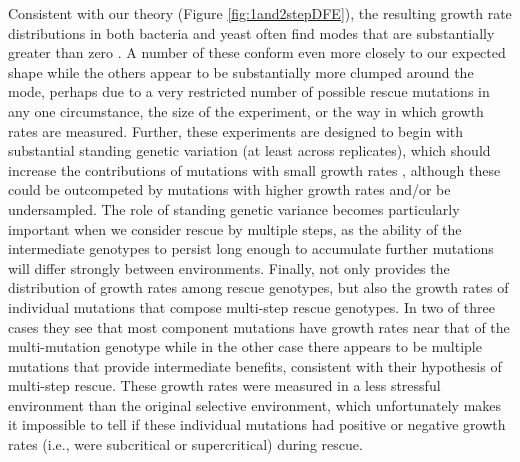 \documentclass[9pt,twocolumn,twoside,lineno]{gsajnl}
\begin{document}
Consistent with our theory (Figure \ref{fig:1and2stepDFE}), the resulting growth rate distributions in both bacteria and yeast often find modes that are substantially greater than zero \citep[as opposed to, say, an exponential distribution;][]{Kassen2006,MacLean2009,Gerstein2012,Lindsey2013,Gerstein2015}.
A number of these conform even more closely to our expected shape \citep{Kassen2006,Gerstein2015} while the others appear to be substantially more clumped around the mode, perhaps due to a very restricted number of possible rescue mutations in any one circumstance, the size of the experiment, or the way in which growth rates are measured.
Further, these experiments are designed to begin with substantial standing genetic variation (at least across replicates), which should increase the contributions of mutations with small growth rates \citep{orr2001haldane}, although these could be outcompeted by mutations with higher growth rates and/or be undersampled.
The role of standing genetic variance becomes particularly important when we consider rescue by multiple steps, as the ability of the intermediate genotypes to persist long enough to accumulate further mutations will differ strongly between environments.
Finally, \cite{Gerstein2015} not only provides the distribution of growth rates among rescue genotypes, but also the growth rates of individual mutations that compose multi-step rescue genotypes.
In two of three cases they see that most component mutations have growth rates near that of the multi-mutation genotype while in the other case there appears to be multiple mutations that provide intermediate benefits, consistent with their hypothesis of multi-step rescue.
These growth rates were measured in a less stressful environment than the original selective environment, which unfortunately makes it impossible to tell if these individual mutations had positive or negative growth rates (i.e., were subcritical or supercritical) during rescue.
\end{document}
